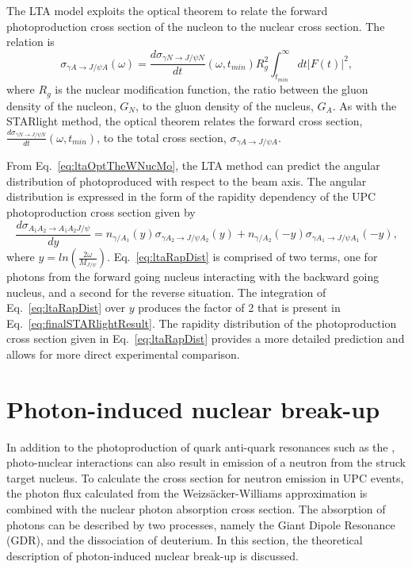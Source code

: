    The LTA model exploits the optical theorem to relate the forward 
     photoproduction cross section of the nucleon to the nuclear cross section. 
   The relation is
   \begin{equation} \label{eq:ltaOptTheWNucMo}
     \sigma_{\gamma A\rightarrow J/\psi A}(\omega)=
     \frac{d\sigma_{\gamma N\rightarrow J/\psi N}}{dt}(\omega,t_{min})
     R_{g}^{2}\int_{t_{min}}^{\infty}dt|F(t)|^{2}\textrm{,}
   \end{equation}
   where $R_{g}$ is the nuclear modification function, the ratio between the gluon 
     density of the nucleon, $G_{N}$, to the gluon density of the nucleus, 
     $G_{A}$.
   As with the STARlight method, the optical theorem relates the forward cross 
     section, $\frac{d\sigma_{\gamma N\rightarrow J/\psi N}}{dt}(\omega,t_{min})$,
     to the total cross section, $\sigma_{\gamma A\rightarrow J/\psi A}$. 

   From Eq.~\ref{eq:ltaOptTheWNucMo}, the LTA method can predict the angular 
     distribution of photoproduced \JPsi{} with respect to the beam axis. 
   The angular distribution is expressed in the form of the rapidity 
    dependency of the UPC photoproduction cross section given by 
   \begin{equation} \label{eq:ltaRapDist}
     \frac{d\sigma_{A_{1}A_{2}\rightarrow A_{1}A_{2}J/\psi}}{dy}=
       n_{\gamma/A_{1}}(y)\sigma_{\gamma A_{2}\rightarrow J/\psi A_{2}}(y)
       +n_{\gamma/A_{2}}(-y)\sigma_{\gamma A_{1}\rightarrow J/\psi A_{1}}(-y)\textrm{,} 
   \end{equation}
   where $y=ln\left(\frac{2\omega}{M_{J/\psi}}\right)$.
   Eq.~\ref{eq:ltaRapDist} is comprised of two terms, one for photons from the
     forward going nucleus interacting with the backward going nucleus, and 
     a second for the reverse situation. 
   The integration of Eq.~\ref{eq:ltaRapDist} over $y$ produces the factor of 2 
     that is present in Eq.~\ref{eq:finalSTARlightResult}.
   The rapidity distribution of the photoproduction cross section given in 
   Eq.~\ref{eq:ltaRapDist} provides a more detailed prediction and allows for
     more direct experimental comparison.

  \section{\label{sec:nucBreakUp}Photon-induced nuclear break-up}
    In addition to the photoproduction of quark anti-quark resonances such as 
      the \JPsi{}, photo-nuclear interactions can also result in emission of a 
      neutron from the struck target nucleus.
    To calculate the cross section for neutron emission in UPC events, the 
      photon flux calculated from the Weizs\"{a}cker-Williams approximation is
      combined with the nuclear photon absorption cross section. 
    The absorption of photons can be described by two processes, namely the 
      Giant Dipole Resonance (GDR), and the dissociation of deuterium.
    In this section, the theoretical description of photon-induced nuclear 
      break-up is discussed.

